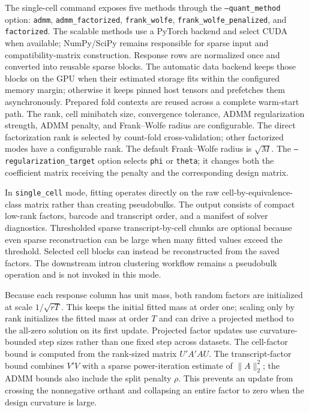 \documentclass[11pt]{article}
\begin{document}
The single-cell command exposes five methods through the
\texttt{--quant\_}\allowbreak\texttt{method} option:
\texttt{admm},
\texttt{admm\_}\allowbreak\texttt{factorized},
\texttt{frank\_}\allowbreak\texttt{wolfe},
\texttt{frank\_}\allowbreak\texttt{wolfe\_}\allowbreak\texttt{penalized}, and
\texttt{factorized}. The scalable methods use a
PyTorch backend and select CUDA when available; NumPy/SciPy remains responsible
for sparse input and compatibility-matrix construction. Response rows are
normalized once and converted into reusable sparse blocks. The automatic data
backend keeps those blocks on the GPU when their estimated storage fits within
the configured memory margin; otherwise it keeps pinned host tensors and
prefetches them asynchronously. Prepared fold contexts are reused across a
complete warm-start path. The rank, cell minibatch
size, convergence tolerance, ADMM regularization strength, ADMM penalty, and
Frank--Wolfe radius are configurable. The direct factorization rank is selected
by count-fold cross-validation; other factorized modes have a configurable
rank. The default Frank--Wolfe radius is \(\sqrt{M}\). The
\texttt{--regularization\_}\allowbreak\texttt{target} option selects \texttt{phi} or
\texttt{theta}; it changes both the coefficient matrix receiving the penalty
and the corresponding design matrix.

In \texttt{single\_cell} mode, fitting operates directly on the raw
cell-by-equivalence-class matrix rather than creating pseudobulks. The output
consists of compact low-rank factors, barcode and transcript order, and a
manifest of solver diagnostics. Thresholded sparse transcript-by-cell chunks
are optional because even sparse reconstruction can be large when many fitted
values exceed the threshold. Selected cell blocks can instead be reconstructed
from the saved factors. The downstream intron clustering workflow remains a
pseudobulk operation and is not invoked in this mode.

Because each response column has unit mass, both random factors are initialized
at scale \(1/\sqrt{rT}\). This keeps the initial fitted mass at order one;
scaling only by rank initializes the fitted mass at order \(T\) and can drive
a projected method to the all-zero solution on its first update.
Projected factor updates use curvature-bounded step sizes rather than one fixed
step across datasets. The cell-factor bound is computed from the rank-sized
matrix \(U'A'AU\). The transcript-factor bound combines \(V'V\) with a sparse
power-iteration estimate of \(\lVert A\rVert_2^2\); the ADMM bounds also include
the split penalty \(\rho\). This prevents an update from crossing the
nonnegative orthant and collapsing an entire factor to zero when the design
curvature is large.
\end{document}

